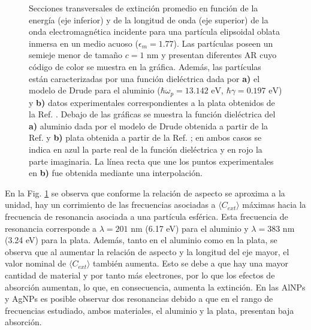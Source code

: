 \begin{figure}[h!]
	\quad%
	\caption{Secciones transversales de extinción promedio en función de la energía (eje inferior) y de la longitud de onda (eje superior) de la onda electromagnética incidente para una partícula elipsoidal oblata inmersa en un medio acuoso ($\epsilon_m=1.77$). Las partículas  poseen un semieje menor de tamaño $c=1$ nm y presentan diferentes AR cuyo código de color se muestra en la gráfica. Además, las partículas están caracterizadas por una función dieléctrica dada por  \textbf{a)} el modelo de Drude para el aluminio ($\hbar\omega_p=13.142\text{ eV}$, $\hbar\gamma=0.197\text{ eV}$) y \textbf{b)} datos experimentales correspondientes a la plata obtenidos de la Ref. \cite{Plata}. Debajo de las gráficas se muestra la función dieléctrica del \textbf{a)} aluminio dada por el modelo de Drude obtenida a partir de la Ref. \cite{Aluminio} y \textbf{b)} plata obtenida a partir de la Ref. \cite{Plata}; en ambos casos se indica en azul la parte real de la función dieléctrica y en rojo la parte imaginaria. La línea recta que une los puntos experimentales en \textbf{b)}  fue obtenida mediante una interpolación.} \label{aluminioplatacc}
\end{figure} 

 En la Fig. \ref{aluminioplatacc} se observa que conforme la relación de aspecto se aproxima a la unidad, hay un corrimiento de las frecuencias asociadas a $\langle C_{ext}\rangle$ máximas hacia la frecuencia de resonancia asociada a una partícula esférica. Esta frecuencia de resonancia corresponde a $\lambda=201\text{ nm}$ (6.17 eV) para el aluminio y $\lambda=383\text{ nm}$ (3.24 eV) para la plata. Además, tanto en el aluminio como en la plata, se observa que al aumentar la relación de aspecto y la longitud del eje mayor, el valor nominal de  $\langle C_{ext}\rangle$ también aumenta. Esto se debe a que hay una mayor cantidad de material y por tanto más electrones, por lo que los efectos de absorción aumentan, lo que, en consecuencia, aumenta la extinción. En las AlNPs y AgNPs es posible observar dos resonancias debido a que en el rango de frecuencias estudiado, ambos materiales, el aluminio y la plata, presentan baja absorción.




